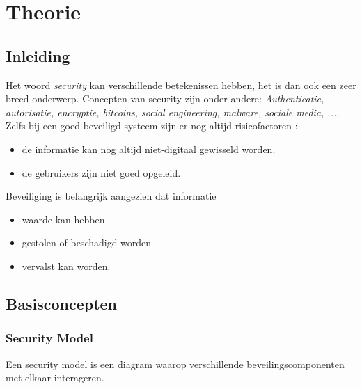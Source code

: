 	\part{Theorie}
	\chapter{Inleiding}
	Het woord \textit{security} kan verschillende betekenissen hebben, het is dan ook een zeer breed onderwerp. Concepten van security zijn onder andere: \textit{Authenticatie, autorisatie, encryptie, bitcoins, social engineering, malware, sociale media, ...}. Zelfs bij een goed beveiligd systeem zijn er nog altijd risicofactoren :
	\begin{itemize}
		\item de informatie kan nog altijd niet-digitaal gewisseld worden.
		\item de gebruikers zijn niet goed opgeleid.
	\end{itemize}
	Beveiliging is belangrijk aangezien dat informatie 
	\begin{itemize}
		\item waarde kan hebben
		\item gestolen of beschadigd worden
		\item vervalst kan worden.
	\end{itemize}
	\chapter{Basisconcepten}
	\section{Security Model}
	Een security model is een diagram waarop verschillende beveilingscomponenten met elkaar interageren.
